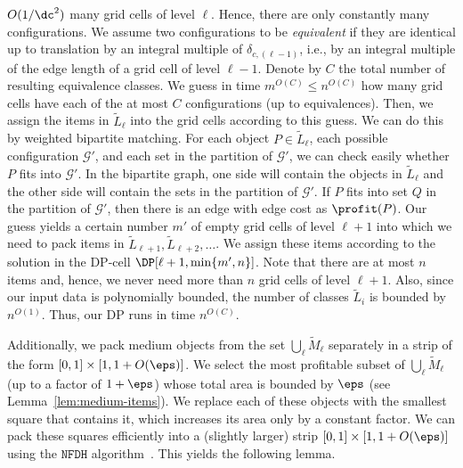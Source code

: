 \documentclass[10pt,a4paper]{article}
\theoremstyle{plain}
\theoremstyle{plain}
\theoremstyle{plain}
\theoremstyle{definition}
\newcommand{\ari}[1]{#1}
\newcommand{\agtwo}[1]{#1}
\begin{document}
{$O(1/\dc^2)$ many grid cells of level $\ell$. Hence, there are only constantly
many configurations.
We assume two configurations to be \emph{equivalent} if they are identical up to translation by an integral multiple of $\delta_{c,(\ell-1)}$, i.e., by an integral multiple of the edge length of a grid cell of level $\ell-1$.
Denote by $C$ the total number of resulting equivalence classes.
We guess in time $m^{O(C)}\le n^{O(C)}$ how many grid cells
have each of the at most $C$ configurations (up to equivalences). Then, we assign the
items in $\tilde{L}_{\ell}$ into the grid cells according to this guess.
\ari{We can do this by weighted bipartite matching. For each object
$P\in \tilde{L}_{\ell}$, each possible configuration $\mathcal{G}'$, and each set in the partition of
$\mathcal{G}'$, we
can check easily whether $P$ fits into $\mathcal{G}'$. 
In the bipartite graph, one side will contain the objects in $\tilde{L}_{\ell}$ and the other side will contain the sets in the partition of
$\mathcal{G}'$.
If $P$ fits into set $Q$ in the \agtwo{partition} of $\mathcal{G}'$, then there is an edge with edge cost as $\profit(P)$. }
Our guess
yields a certain number $m'$ of empty grid cells of level $\ell+1$
into which we need to pack items in $\tilde{L}_{\ell+1},\tilde{L}_{\ell+2},\dots$.
We assign these items according to the solution in the DP-cell $\DP[\ell+1,\min\{m',n\}]$.
Note that there are at most $n$ items and, hence, we never need more
than $n$ grid cells of level $\ell+1$. Also, since our input data is
polynomially bounded, the number of classes $\tilde{L}_{i}$ is bounded
by~$n^{O(1)}$. Thus, our DP runs in time $n^{O(C)}$.

Additionally, we pack medium objects from the set $\bigcup_{\ell}\tilde{M}_{\ell}$
separately in a strip of the form $[0,1]\times[1,1+O(\eps)]$. We select the most profitable subset of $\bigcup_{\ell}\tilde{M}_{\ell}$
(up to a factor of $1+\eps$) whose total area is bounded by $\eps$
(see Lemma~\ref{lem:medium-items}).
We replace each
of these objects with the smallest square that contains it, which
increases its area only by a constant factor.
We can pack these squares efficiently into a (slightly larger) strip $[0,1]\times[1,1+O(\eps)]$ using the $\mathtt{NFDH}$ algorithm~\cite{NFDH}. This yields the following lemma.

}
\end{document}
